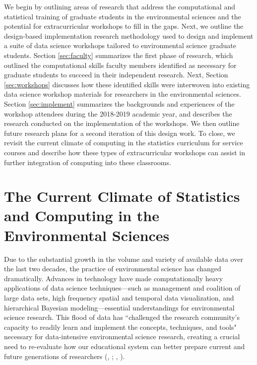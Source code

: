 \documentclass[12pt]{article}
\begin{document}
\quad We begin by outlining areas of research that address the computational and
statistical training of graduate students in the environmental sciences and the 
potential for extracurricular workshops to fill in the gaps. Next, we outline 
the design-based implementation research methodology used to design and 
implement a suite of data science workshops tailored to environmental science 
graduate students. Section \ref{sec:faculty} summarizes the first phase of 
research, which outlined the computational skills faculty members identified as 
necessary for graduate students to succeed in their independent research. Next, 
Section \ref{sec:workshops} discusses how these identified skills were 
interwoven into existing data science workshop materials for researchers in the 
environmental sciences. Section \ref{sec:implement} summarizes the backgrounds 
and experiences of the workshop attendees during the 2018-2019 academic year, 
and describes the research conducted on the implementation of the workshops. We 
then outline future research plans for a second iteration of this design work. 
To close, we revisit the current climate of computing in the statistics 
curriculum for service courses and describe how these types of extracurricular 
workshops can assist in further integration of computing into these classrooms. 

\section{The Current Climate of Statistics and Computing in the Environmental 
Sciences}
\label{sec:lit}

\quad Due to the substantial growth in the volume and variety of available data 
over the last two decades, the practice of environmental science has changed 
dramatically. Advances in technology have made computationally heavy 
applications of data science techniques---such as management and coalition of 
large data sets, high frequency spatial and temporal data visualization, and 
hierarchical Bayesian modeling---essential understandings for environmental 
science research. This flood of data has ``challenged the research community's 
capacity to readily learn and implement the concepts, techniques, and tools" 
\citep[p. 546]{hampton} necessary for data-intensive environmental science 
research, creating a crucial need to re-evaluate how our educational system can
better prepare current and future generations of researchers 
(\citeauthor{green}, \citeyear{green}; \citeauthor{hampton}, 
\citeyear{hampton}).  
\end{document}
